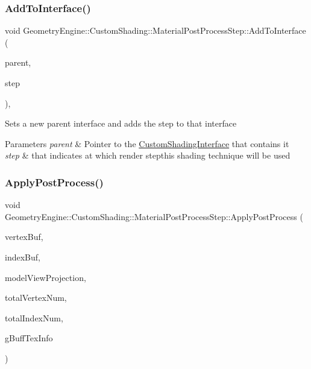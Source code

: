 \subsubsection{\texorpdfstring{AddToInterface()}{AddToInterface()}}
{\footnotesize\ttfamily void Geometry\+Engine\+::\+Custom\+Shading\+::\+Material\+Post\+Process\+Step\+::\+Add\+To\+Interface (\begin{DoxyParamCaption}\item[{\mbox{\hyperlink{class_geometry_engine_1_1_custom_shading_1_1_material_post_process_interface}{Material\+Post\+Process\+Interface}} $\ast$}]{parent,  }\item[{\mbox{\hyperlink{namespace_geometry_engine_1_1_custom_shading_af8b09b91ca7086f4f67a5d4181f35e58}{Material\+Post\+Process\+Steps}}}]{step }\end{DoxyParamCaption})\hspace{0.3cm}{\ttfamily [protected]}, {\ttfamily [virtual]}}

Sets a new parent interface and adds the step to that interface 
\begin{DoxyParams}{Parameters}
{\em parent} & Pointer to the \mbox{\hyperlink{class_geometry_engine_1_1_custom_shading_1_1_custom_shading_interface}{Custom\+Shading\+Interface}} that contains it \\
\hline
{\em step} & that indicates at which render stepthis shading technique will be used \\
\hline
\end{DoxyParams}
\mbox{\label{class_geometry_engine_1_1_custom_shading_1_1_material_post_process_step_a3caabead68eaf1b4f19e9cd726132741}} 
\subsubsection{\texorpdfstring{ApplyPostProcess()}{ApplyPostProcess()}}
{\footnotesize\ttfamily void Geometry\+Engine\+::\+Custom\+Shading\+::\+Material\+Post\+Process\+Step\+::\+Apply\+Post\+Process (\begin{DoxyParamCaption}\item[{Q\+Open\+G\+L\+Buffer $\ast$}]{vertex\+Buf,  }\item[{Q\+Open\+G\+L\+Buffer $\ast$}]{index\+Buf,  }\item[{const Q\+Matrix4x4 \&}]{model\+View\+Projection,  }\item[{unsigned int}]{total\+Vertex\+Num,  }\item[{unsigned int}]{total\+Index\+Num,  }\item[{const \mbox{\hyperlink{class_geometry_engine_1_1_g_buffer_texture_info}{G\+Buffer\+Texture\+Info}} \&}]{g\+Buff\+Tex\+Info }\end{DoxyParamCaption})\hspace{0.3cm}{\ttfamily [virtual]}}

